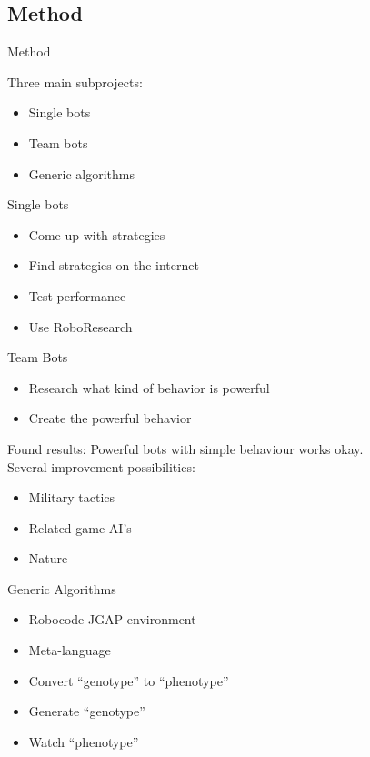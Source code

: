 \documentclass{beamer}
\newcommand{\slide}[2]
{
\begin{frame}
\begin{block}{#1} 

#2

\end{block} 
\end{frame}
}
\begin{document}



\subsection{Method}
\slide{Method}{
Three main subprojects:
\begin{itemize}
 \item Single bots
 \item Team bots
 \item Generic algorithms
\end{itemize}
}
\slide{Single bots}{
\begin{itemize}
 \item Come up with strategies
 \item Find strategies on the internet
 \item Test performance
 \item Use RoboResearch
\end{itemize}
}
\slide{Team Bots}{
\begin{itemize}
 \item Research what kind of behavior is powerful
 \item Create the powerful behavior
\end{itemize}
Found results: Powerful bots with simple behaviour works okay.\\
Several improvement possibilities: \\
\begin{itemize}
 \item Military tactics
 \item Related game AI's 
 \item Nature 
\end{itemize}
}
\slide{Generic Algorithms}{
\begin{itemize}
 \item Robocode JGAP environment
 \item Meta-language
 \item Convert ``genotype'' to ``phenotype''
 \item Generate ``genotype''
 \item Watch ``phenotype''
\end{itemize}
}
\end{document}
